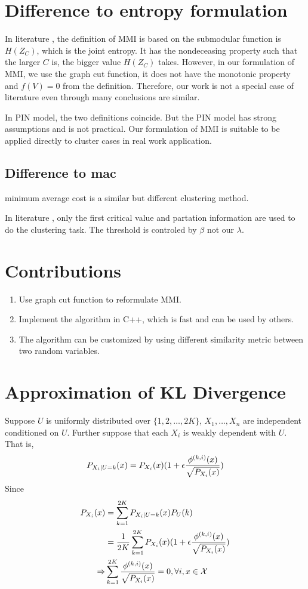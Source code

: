 \documentclass{article}
\begin{document}
\section{Difference to entropy formulation}
In literature \cite{ic}, the definition of MMI is based on the submodular function is $H(Z_C)$, which is the joint entropy. It has the nondeceasing property such that the larger $C$ is, the bigger value $H(Z_C)$ takes. However, in our formulation of MMI, we use the graph cut function, it does not have the monotonic property and $f(V) = 0$ from the definition. Therefore, our work is not a special case of literature \cite{ic} even through many conclusions are similar.

In PIN model, the two definitions coincide. But the PIN model has strong assumptions and is not practical. Our formulation of MMI is suitable to be applied directly to cluster cases in real work application.
\subsection{Difference to mac}
minimum average cost is a similar but different clustering method.

In literature \cite{mac}, only the first critical value and partation information are used to do the clustering task. The threshold is controled by $\beta$ not our $\lambda$.
\section{Contributions}
\begin{enumerate}
\item Use graph cut function to reformulate MMI.
\item Implement the algorithm in C++, which is fast and can be used by others.
\item The algorithm can be customized by using different similarity metric between two random variables.
\end{enumerate}
\appendix
\section{Approximation of KL Divergence}\label{sec:akld}
Suppose $U$ is uniformly distributed over $\{1, 2,\dots, 2K\}$, $X_1, \dots, X_n$ are independent conditioned on $U$.
Further suppose that each $X_i$ is weakly dependent with $U$.  That is, 
$$
P_{X_i | U=k}(x) = P_{X_i} (x)( 1 + \epsilon {\phi^{(k,i)}(x ) \over \sqrt{P_{X_i}(x)}} )
$$
Since 
\begin{align*}
P_{X_i}(x) &= \sum_{k=1}^{2K} P_{X_i | U=k}(x) P_U(k) \\
& = {1 \over 2K} \sum_{k=1}^{2K}P_{X_i} (x)( 1 + \epsilon {\phi^{(k,i)}(x ) \over \sqrt{P_{X_i}(x)}} )\\
\Rightarrow & \sum_{k=1}^{2K} {\phi^{(k, i)}(x) \over \sqrt{P_{X_i}(x)}} =0,\forall i, x\in \mathcal{X}
\end{align*}
\end{document}
